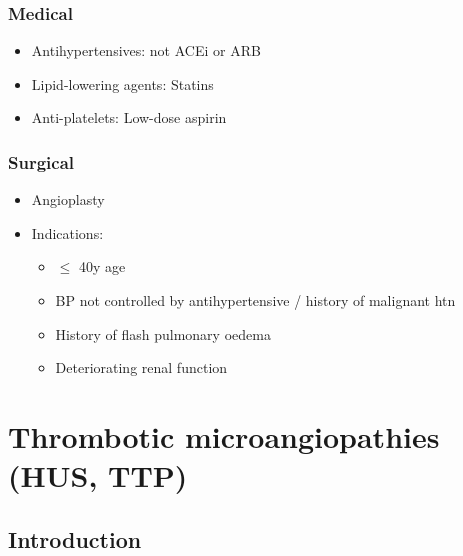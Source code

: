 \documentclass[
  12pt,
]{memoir}
\providecommand{\tightlist}{%
  \setlength{\itemsep}{0pt}\setlength{\parskip}{0pt}}
\begin{document}
\hypertarget{medical}{%
\subsubsection{Medical}\label{medical}}

\begin{itemize}
\tightlist
\item
  Antihypertensives: not ACEi or ARB
\item
  Lipid-lowering agents: Statins
\item
  Anti-platelets: Low-dose aspirin
\end{itemize}

\hypertarget{surgical}{%
\subsubsection{Surgical}\label{surgical}}

\begin{itemize}
\tightlist
\item
  Angioplasty
\item
  Indications:

  \begin{itemize}
  \tightlist
  \item
    \(\le\) 40y age
  \item
    BP not controlled by antihypertensive / history of malignant htn
  \item
    History of flash pulmonary oedema
  \item
    Deteriorating renal function
  \end{itemize}
\end{itemize}

\hypertarget{thrombotic-microangiopathies-hus-ttp}{%
\section{Thrombotic microangiopathies (HUS,
TTP)}\label{thrombotic-microangiopathies-hus-ttp}}

\hypertarget{introduction-3}{%
\subsection{Introduction}\label{introduction-3}}
\end{document}
